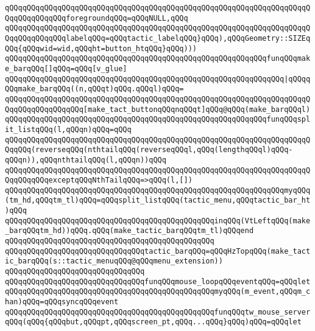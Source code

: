 \verb|qQQqqQQqqQQqqQQqqQQqqQQqqQQqqQQqqQQqqQQqqQQqqQQqqQQqqQQqqQQqqQQqqQQqqQQqqQQqqQQqqQQqforegroundqQQq=qQQqNULL,qQQq|\newline
\verb|qQQqqQQqqQQqqQQqqQQqqQQqqQQqqQQqqQQqqQQqqQQqqQQqqQQqqQQqqQQqqQQqqQQqqQQqqQQqqQQqqQQqlabelqQQq=qQQqtactic_labelqQQq}qQQq),qQQqGeometry::SIZEqQQq{qQQqwid=wid,qQQqht=button_htqQQq}qQQq)))|\newline
\verb|qQQqqQQqqQQqqQQqqQQqqQQqqQQqqQQqqQQqqQQqqQQqqQQqqQQqqQQqqQQqfunqQQqmake_barqQQq[]qQQq=qQQq[v_glue]|\newline
\verb|qQQqqQQqqQQqqQQqqQQqqQQqqQQqqQQqqQQqqQQqqQQqqQQqqQQqqQQqqQQqqQQq|\verb#|qQQqqQQqmake_barqQQq((n,qQQqt)qQQq.qQQql)qQQq=#\newline
\verb|qQQqqQQqqQQqqQQqqQQqqQQqqQQqqQQqqQQqqQQqqQQqqQQqqQQqqQQqqQQqqQQqqQQqqQQqqQQqqQQqqQQqqQQq[make_tact_buttonqQQqnqQQqt]qQQq@qQQq(make_barqQQql)|\newline
\verb|qQQqqQQqqQQqqQQqqQQqqQQqqQQqqQQqqQQqqQQqqQQqqQQqqQQqqQQqqQQqfunqQQqsplit_listqQQq(l,qQQqn)qQQq=qQQq|\newline
\verb|qQQqqQQqqQQqqQQqqQQqqQQqqQQqqQQqqQQqqQQqqQQqqQQqqQQqqQQqqQQqqQQqqQQqqQQqqQQq(reverseqQQq(nthtailqQQq(reverseqQQql,qQQq(lengthqQQql)qQQq-qQQqn)),qQQqnthtailqQQq(l,qQQqn))qQQq|\newline
\verb|qQQqqQQqqQQqqQQqqQQqqQQqqQQqqQQqqQQqqQQqqQQqqQQqqQQqqQQqqQQqqQQqqQQqqQQqqQQqqQQqexceptqQQqNthTailqQQq=>qQQq(l,[])|\newline
\verb|qQQqqQQqqQQqqQQqqQQqqQQqqQQqqQQqqQQqqQQqqQQqqQQqqQQqqQQqqQQqqQQqmyqQQq(tm_hd,qQQqtm_tl)qQQq=qQQqsplit_listqQQq(tactic_menu,qQQqtactic_bar_ht)qQQq|\newline
\verb|qQQqqQQqqQQqqQQqqQQqqQQqqQQqqQQqqQQqqQQqqQQqqQQqinqQQq(VtLeftqQQq(make_barqQQqtm_hd))qQQq.qQQq(make_tactic_barqQQqtm_tl)qQQqend|\newline
\verb|qQQqqQQqqQQqqQQqqQQqqQQqqQQqqQQqqQQqqQQqqQQqqQQq|\newline
\verb|qQQqqQQqqQQqqQQqqQQqqQQqqQQqqQQqtactic_barqQQq=qQQqHzTopqQQq(make_tactic_barqQQq(s::tactic_menuqQQq@qQQqmenu_extension))|\newline
\verb|qQQqqQQqqQQqqQQqqQQqqQQqqQQqqQQq|\newline
\verb|qQQqqQQqqQQqqQQqqQQqqQQqqQQqqQQqfunqQQqmouse_loopqQQqeventqQQq=qQQqlet|\newline
\verb|qQQqqQQqqQQqqQQqqQQqqQQqqQQqqQQqqQQqqQQqqQQqqQQqmyqQQq(m_event,qQQqm_chan)qQQq=qQQqsyncqQQqevent|\newline
\verb|qQQqqQQqqQQqqQQqqQQqqQQqqQQqqQQqqQQqqQQqqQQqqQQqfunqQQqtw_mouse_serverqQQq(qQQq{qQQqbut,qQQqpt,qQQqscreen_pt,qQQq...qQQq}qQQq)qQQq=qQQqlet|\newline
